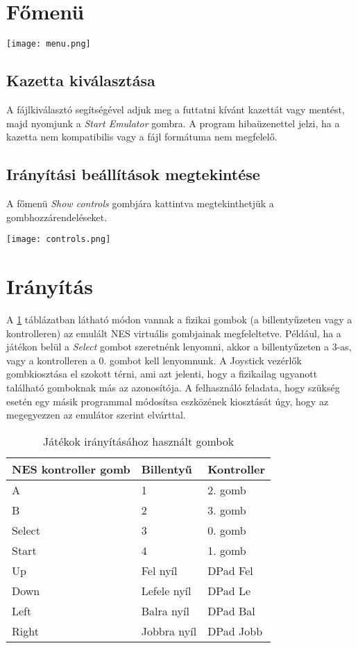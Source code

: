 \section{Főmenü}

\begin{center}
	\texttt{[image: menu.png]}
\end{center}

\subsection{Kazetta kiválasztása}

A fájlkiválasztó segítségével adjuk meg a futtatni kívánt kazettát vagy mentést, majd nyomjunk a \emph{Start Emulator} gombra.
A program hibaüzenettel jelzi, ha a kazetta nem kompatibilis vagy a fájl formátuma nem megfelelő.

\subsection{Irányítási beállítások megtekintése}

A főmenü \emph{Show controls} gombjára kattintva megtekinthetjük a gombhozzárendeléseket.

\begin{center}
	\texttt{[image: controls.png]}
\end{center}


\section {Irányítás}

A \ref{fig:btns} táblázatban látható módon vannak a fizikai gombok (a billentyűzeten vagy a kontrolleren) az emulált NES virtuális gombjainak megfeleltetve. Például, ha a játékon belül a \emph{Select} gombot szeretnénk lenyomni, akkor a billentyűzeten a 3-as, vagy a kontrolleren a 0. gombot kell lenyomnunk.
A Joystick vezérlők gombkiosztása el szokott térni, ami azt jelenti, hogy a fizikailag ugyanott található gomboknak más az azonosítója. A felhasználó feladata, hogy szükség esetén egy másik programmal módosítsa eszközének kiosztását úgy, hogy az megegyezzen az emulátor szerint elvárttal.

\begin{table}[H]
	\centering
	\begin{tabular}{ | l |  l | l | }
		\hline
		NES kontroller gomb & Billentyű & Kontroller \\
		\hline			
		A      & 1 & 2. gomb \\
		B      & 2 & 3. gomb \\
		Select & 3 & 0. gomb \\
		Start  & 4 & 1. gomb \\
		Up     & Fel nyíl & DPad Fel \\
		Down   & Lefele nyíl & DPad Le \\
		Left   & Balra nyíl & DPad Bal \\ 
		Right  & Jobbra nyíl & DPad Jobb \\
		\hline
	\end{tabular}
	\caption{Játékok irányításához használt gombok}
	\label{fig:btns}
\end{table}

